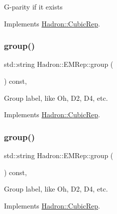G-\/parity if it exists 

Implements \mbox{\hyperlink{structHadron_1_1CubicRep_a52104e43266d1614c00bbd1c3b395458}{Hadron\+::\+Cubic\+Rep}}.

\mbox{\label{structHadron_1_1EMRep_aa1ca6e0e98d03340cb05616f1ea52f79}} 
\subsubsection{\texorpdfstring{group()}{group()}\hspace{0.1cm}{\footnotesize\ttfamily [1/3]}}
{\footnotesize\ttfamily std\+::string Hadron\+::\+E\+M\+Rep\+::group (\begin{DoxyParamCaption}{ }\end{DoxyParamCaption}) const\hspace{0.3cm}{\ttfamily [inline]}, {\ttfamily [virtual]}}

Group label, like Oh, D2, D4, etc. 

Implements \mbox{\hyperlink{structHadron_1_1CubicRep_a0748f11ec87f387062c8e8981339a29c}{Hadron\+::\+Cubic\+Rep}}.

\mbox{\label{structHadron_1_1EMRep_aa1ca6e0e98d03340cb05616f1ea52f79}} 
\subsubsection{\texorpdfstring{group()}{group()}\hspace{0.1cm}{\footnotesize\ttfamily [2/3]}}
{\footnotesize\ttfamily std\+::string Hadron\+::\+E\+M\+Rep\+::group (\begin{DoxyParamCaption}{ }\end{DoxyParamCaption}) const\hspace{0.3cm}{\ttfamily [inline]}, {\ttfamily [virtual]}}

Group label, like Oh, D2, D4, etc. 

Implements \mbox{\hyperlink{structHadron_1_1CubicRep_a0748f11ec87f387062c8e8981339a29c}{Hadron\+::\+Cubic\+Rep}}.

\mbox{\label{structHadron_1_1EMRep_aa1ca6e0e98d03340cb05616f1ea52f79}} 
